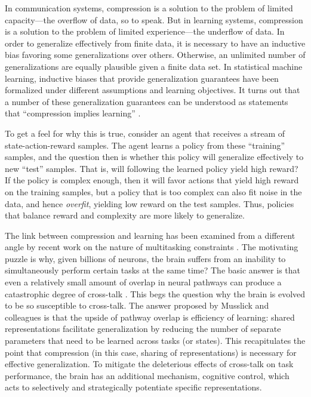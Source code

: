 \documentclass[11pt]{article}
\begin{document}
In communication systems, compression is a solution to the problem of limited capacity---the overflow of data, so to speak. But in learning systems, compression is a solution to the problem of limited experience---the underflow of data. In order to generalize effectively from finite data, it is necessary to have an inductive bias favoring some generalizations over others. Otherwise, an unlimited number of generalizations are equally plausible given a finite data set. In statistical machine learning, inductive biases that provide generalization guarantees have been formalized under different assumptions and learning objectives. It turns out that a number of these generalization guarantees can be understood as statements that ``compression implies learning'' \citep{blum03,blumer87}.

To get a feel for why this is true, consider an agent that receives a stream of state-action-reward samples. The agent learns a policy from these ``training'' samples, and the question then is whether this policy will generalize effectively to new ``test'' samples. That is, will following the learned policy yield high reward? If the policy is complex enough, then it will favor actions that yield high reward on the training samples, but a policy that is too complex can also fit noise in the data, and hence \emph{overfit}, yielding low reward on the test samples. Thus, policies that balance reward and complexity are more likely to generalize.

The link between compression and learning has been examined from a different angle by recent work on the nature of multitasking constraints \citep{musslick17,musslick20,sagiv18}. The motivating puzzle is why, given billions of neurons, the brain suffers from an inability to simultaneously perform certain tasks at the same time? The basic answer is that even a relatively small amount of overlap in neural pathways can produce a catastrophic degree of cross-talk \citep{feng14}. This begs the question why the brain is evolved to be so susceptible to cross-talk. The answer proposed by Musslick and colleagues is that the upside of pathway overlap is efficiency of learning: shared representations facilitate generalization by reducing the number of separate parameters that need to be learned across tasks (or states). This recapitulates the point that compression (in this case, sharing of representations) is necessary for effective generalization. To mitigate the deleterious effects of cross-talk on task performance, the brain has an additional mechanism, cognitive control, which acts to selectively and strategically potentiate specific representations.
\end{document}
